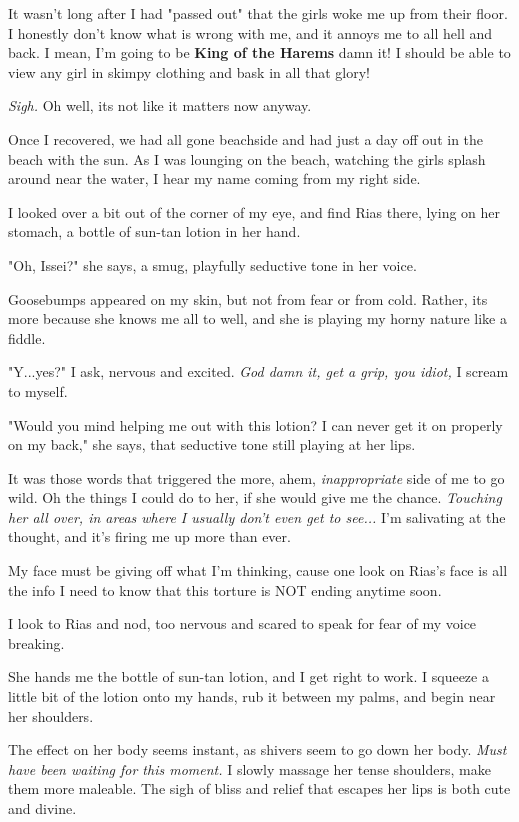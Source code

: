 \documentclass{article}
\begin{document}
It wasn't long after I had "passed out" that the girls woke me up from their floor. I honestly don't know what is wrong with me, and it annoys me to all hell and back. I mean, I'm going to be \textbf{King of the Harems} damn it! I should be able to view any girl in skimpy clothing and bask in all that glory!

\emph{Sigh.} Oh well, its not like it matters now anyway.

Once I recovered, we had all gone beachside and had just a day off out in the beach with the sun. As I was lounging on the beach, watching the girls splash around near the water, I hear my name coming from my right side.

I looked over a bit out of the corner of my eye, and find Rias there, lying on her stomach, a bottle of sun-tan lotion in her hand.

"Oh, Issei?" she says, a smug, playfully seductive tone in her voice.

Goosebumps appeared on my skin, but not from fear or from cold. Rather, its more because she knows me all to well, and she is playing my horny nature like a fiddle.
 
"Y...yes?" I ask, nervous and excited. \emph{God damn it, get a grip, you idiot,} I scream to myself.

"Would you mind helping me out with this lotion? I can never get it on properly on my back," she says, that seductive tone still playing at her lips.

It was those words that triggered the more, ahem, \emph{inappropriate} side of me to go wild. Oh the things I could do to her, if she would give me the chance. \emph{Touching her all over, in areas where I usually don't even get to see...} I'm salivating at the thought, and it's firing me up more than ever.

My face must be giving off what I'm thinking, cause one look on Rias's face is all the info I need to know that this torture is NOT ending anytime soon.

I look to Rias and nod, too nervous and scared to speak for fear of my voice breaking. 

She hands me the bottle of sun-tan lotion, and I get right to work. I squeeze a little bit of the lotion onto my hands, rub it between my palms, and begin near her shoulders. 

The effect on her body seems instant, as shivers seem to go down her body. \emph{Must have been waiting for this moment.} I slowly massage her tense shoulders, make them more maleable. The sigh of bliss and relief that escapes her lips is both cute and divine.
\end{document}

